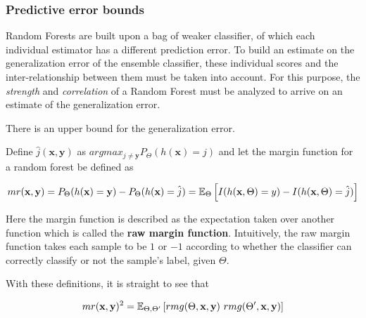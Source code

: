 \subsubsection{Predictive error bounds}

Random Forests are built upon a bag of weaker classifier, of which each individual estimator has a different prediction error. To build an estimate on the generalization error of the ensemble classifier, these individual scores and the inter-relationship between them must be taken into account. For this purpose, the \textit{strength} and \textit{correlation} of a Random Forest must be analyzed to arrive on an estimate of the generalization error.


\begin{theorem}
There is an upper bound for the generalization error.
\end{theorem}

Define $\hat{j}(\textbf{x},\textbf{y})$ as $arg max_{j\neq \textbf{y}} P_{\Theta}(h(\textbf{x}) = j)$ and let the margin function for a random forest be defined as

\begin{equation}\label{eq:rf-marginFunRf}
mr(\textbf{x},\textbf{y}) =  P_{\Theta}(h(\textbf{x}) = \textbf{y}) - P_{\Theta}(h(\textbf{x}) = \hat{j})
\\
= \operatorname{\mathbb{E}}_{\Theta} \left[  I(h(\textbf{x},\Theta ) = y ) - I( h( \textbf{x},\Theta ) = \hat{j} )  \right]
\end{equation}




Here the margin function is described as the expectation taken over another function which is called the \textbf{raw margin function}\label{eq:rf-rawMarginFun}. Intuitively, the raw margin function takes each sample to be $1$ or $-1$ according to whether the classifier can correctly classify or not the sample's label, given $\Theta$.

With these definitions, it is straight to see that

\begin{equation}
mr( \textbf{x},\textbf{y} )^2 = \Expect_{\Theta, \Theta'} \left[ rmg( \Theta,\textbf{x},\textbf{y} ) \ rmg(\Theta',\textbf{x},\textbf{y} )  \right] 
\end{equation}


